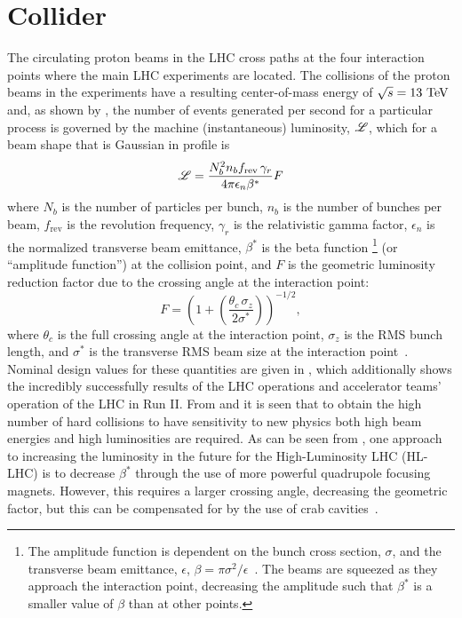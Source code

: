 \section{Collider}

The circulating proton beams in the LHC cross paths at the four interaction points where the main LHC experiments are located.
The collisions of the proton beams in the experiments have a resulting center-of-mass energy of $\sqrt{s} = 13~\mathrm{TeV}$ and, as shown by , the number of events generated per second for a particular process is governed by the machine (instantaneous) luminosity, $\mathscr{L}$, which for a beam shape that is Gaussian in profile is
\begin{equation}
 \mathscr{L} = \frac{N_{b}^{2} n_{b} f_{\mathrm{rev}} \,\gamma_{r}}{4 \pi \epsilon_{n} \beta^{*}} F
 \label{eq:machine_luminosity}
\end{equation}
where $N_{b}$ is the number of particles per bunch, $n_{b}$ is the number of bunches per beam, $f_{\mathrm{rev}}$ is the revolution frequency, $\gamma_{r}$ is the relativistic gamma factor, $\epsilon_{n}$ is the normalized transverse beam emittance, $\beta^{*}$ is the beta function%
\footnote{The amplitude function is dependent on the bunch cross section, $\sigma$, and the transverse beam emittance, $\epsilon$, $\beta = \pi \sigma^{2}/\epsilon$~\cite{PDG2018:Ch30}.
 The beams are squeezed as they approach the interaction point, decreasing the amplitude such that $\beta^{*}$ is a smaller value of $\beta$ than at other points.}
(or ``amplitude function'') at the collision point, and $F$ is the geometric luminosity reduction factor due to the crossing angle at the interaction point:
\[
 F = \left(1 + \left(\frac{\theta_{c} \,\sigma_{z}}{2 \sigma^{*}}\right)\right)^{-1/2},
\]
where $\theta_{c}$ is the full crossing angle at the interaction point, $\sigma_{z}$ is the RMS bunch length, and $\sigma^{*}$ is the transverse RMS beam size at the interaction point~\cite{Evans:2008}.
Nominal design values for these quantities are given in , which additionally shows the incredibly successfully results of the LHC operations and accelerator teams' operation of the LHC in Run II.
From  and  it is seen that to obtain the high number of hard collisions to have sensitivity to new physics both high beam energies and high luminosities are required.
As can be seen from , one approach to increasing the luminosity in the future for the High-Luminosity LHC (HL-LHC) is to decrease $\beta^{*}$ through the use of more powerful quadrupole focusing magnets.
However, this requires a larger crossing angle, decreasing the geometric factor, but this can be compensated for by the use of crab cavities~\cite{PhysRevAccelBeams.19.101003}.

